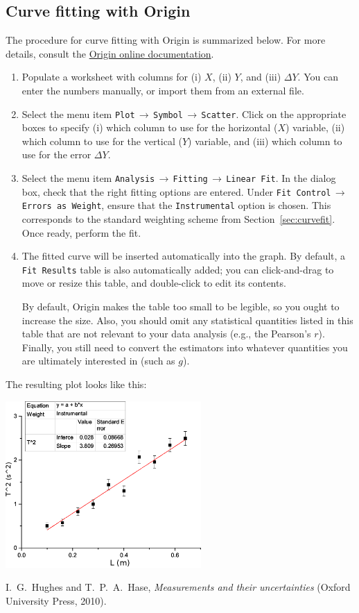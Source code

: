 \documentclass[11pt,a4paper]{article}
\begin{document}
\subsection{Curve fitting with Origin}

The procedure for curve fitting with Origin is summarized below.
For more details, consult the
\href{https://www.originlab.com/doc/Origin-Help/Linear-Polynomial-Regression}{Origin
  online documentation}.

\begin{enumerate}
\item Populate a worksheet with columns for (i) $X$, (ii) $Y$, and
  (iii) $\Delta Y$.  You can enter the numbers manually, or import
  them from an external file.

\item Select the menu item
  \texttt{Plot$\,\rightarrow\,$Symbol$\,\rightarrow\,$Scatter}.  Click on the
  appropriate boxes to specify (i) which column to use for the
  horizontal ($X$) variable, (ii) which column to use for the vertical
  ($Y$) variable, and (iii) which column to use for the error $\Delta
  Y$.

\item Select the menu item
  \texttt{Analysis$\,\rightarrow\,$Fitting$\,\rightarrow\,$Linear
    Fit}.  In the dialog box, check that the right fitting options are
  entered.  Under \texttt{Fit Control$\,\rightarrow\,$Errors as
    Weight}, ensure that the \texttt{Instrumental} option is chosen.
  This corresponds to the standard weighting scheme from
  Section~\ref{sec:curvefit}.  Once ready, perform the fit.

\item The fitted curve will be inserted automatically into the graph.
  By default, a \texttt{Fit Results} table is also automatically
  added; you can click-and-drag to move or resize this table, and
  double-click to edit its contents.

  By default, Origin makes the table too small to be legible, so you
  ought to increase the size.  Also, you should omit any statistical
  quantities listed in this table that are not relevant to your data
  analysis (e.g., the Pearson's $r$).  Finally, you still need to
  convert the estimators into whatever quantities you are ultimately
  interested in (such as $g$).
\end{enumerate}

The resulting plot looks like this:
\begin{center}
  \includegraphics[width=0.56\textwidth]{origin.png}
\end{center}


\begin{thebibliography}{99}
 I.~G.~Hughes and T.~P.~A.~Hase, \textit{Measurements
  and their uncertainties} (Oxford University Press, 2010).
\end{thebibliography}
\end{document}
